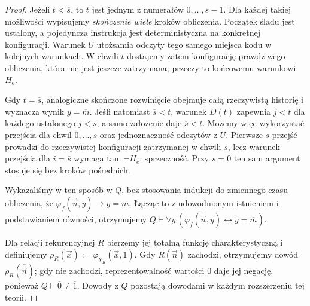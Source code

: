 \documentclass[11pt,a4paper]{article}
\numberwithin{equation}{section}
\theoremstyle{plain}
\theoremstyle{definition}
\theoremstyle{remark}
\begin{document}
\begin{proof}
Jeżeli $t<\overline s$, to $t$ jest jednym z numerałów $\overline0,\ldots,\overline{s-1}$. Dla każdej takiej możliwości wypisujemy \emph{skończenie wiele} kroków obliczenia. Początek śladu jest ustalony, a pojedyncza instrukcja jest deterministyczna na konkretnej konfiguracji. Warunek $U$ utożsamia odczyty tego samego miejsca kodu w kolejnych warunkach. W chwili $t$ dostajemy zatem konfigurację prawdziwego obliczenia, która nie jest jeszcze zatrzymana; przeczy to końcowemu warunkowi $H_e$.

Gdy $t=\overline s$, analogiczne skończone rozwinięcie obejmuje całą rzeczywistą historię i wyznacza wynik $y=\overline m$. Jeśli natomiast $\overline s<t$, warunek $D(t)$ zapewnia $\overline j<t$ dla każdego ustalonego $j<s$, a samo założenie daje $\overline s<t$. Możemy więc wykorzystać przejścia dla chwil $0,\ldots,s$ oraz jednoznaczność odczytów z $U$. Pierwsze $s$ przejść prowadzi do rzeczywistej konfiguracji zatrzymanej w chwili $s$, lecz warunek przejścia dla $i=\overline s$ wymaga tam $\neg H_e$: sprzeczność. Przy $s=0$ ten sam argument stosuje się bez kroków pośrednich.

Wykazaliśmy w ten sposób w $Q$, bez stosowania indukcji do zmiennego czasu obliczenia, że
$\varphi_f(\overline{\vec n},y)\to y=\overline m$.
Łącząc to z udowodnionym istnieniem i podstawianiem równości, otrzymujemy
$Q\vdash\forall y\,(\varphi_f(\overline{\vec n},y)\leftrightarrow y=\overline m)$.

Dla relacji rekurencyjnej $R$ bierzemy jej totalną funkcję charakterystyczną i definiujemy $\rho_R(\vec x):=\varphi_{\chi_R}(\vec x,\overline1)$. Gdy $R(\vec n)$ zachodzi, otrzymujemy dowód $\rho_R(\overline{\vec n})$; gdy nie zachodzi, reprezentowalność wartości $0$ daje jej negację, ponieważ $Q\vdash\overline0\ne\overline1$. Dowody z $Q$ pozostają dowodami w każdym rozszerzeniu tej teorii.
\end{proof}
\end{document}
